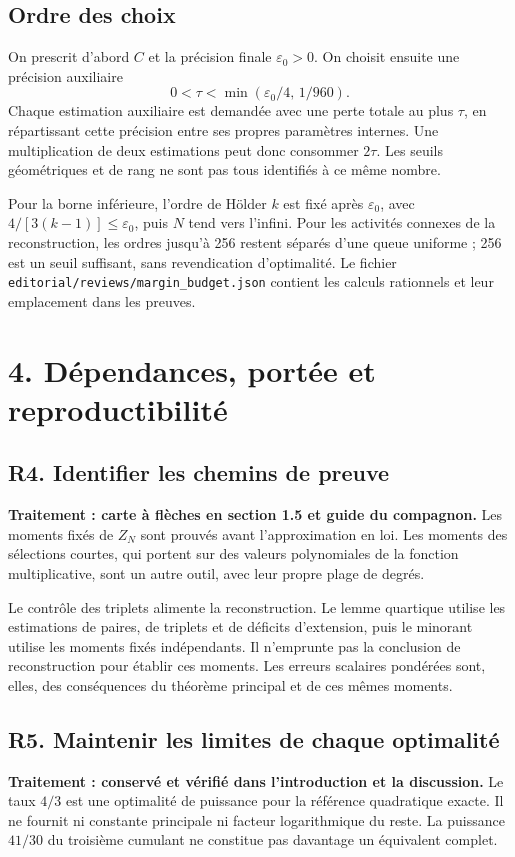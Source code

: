 \documentclass[11pt,a4paper]{article}
\newcommand{\eps}{\varepsilon}
\begin{document}
\subsection*{Ordre des choix}
On prescrit d'abord \(C\) et la précision finale \(\eps_0>0\).
On choisit ensuite une précision auxiliaire
\[
 0<\tau<\min(\eps_0/4,\,1/960).
\]
Chaque estimation auxiliaire est demandée avec une perte totale au
plus \(\tau\), en répartissant cette précision entre ses propres
paramètres internes. Une multiplication de deux estimations peut
donc consommer \(2\tau\). Les seuils géométriques et de rang ne sont
pas tous identifiés à ce même nombre.

Pour la borne inférieure, l'ordre de Hölder \(k\) est fixé après
\(\eps_0\), avec \(4/[3(k-1)]\le\eps_0\), puis \(N\) tend vers
l'infini. Pour les activités connexes de la reconstruction, les ordres
jusqu'à 256 restent séparés d'une queue uniforme ; 256 est un seuil
suffisant, sans revendication d'optimalité.
Le fichier \texttt{editorial/reviews/margin\_budget.json} contient
les calculs rationnels et leur emplacement dans les preuves.

\clearpage
\section*{4. Dépendances, portée et reproductibilité}

\subsection*{R4. Identifier les chemins de preuve}
\textbf{Traitement : carte à flèches en section 1.5 et guide du compagnon.}
Les moments fixés de \(Z_N\) sont prouvés avant l'approximation en loi.
Les moments des sélections courtes, qui portent sur des valeurs
polynomiales de la fonction multiplicative, sont un autre outil,
avec leur propre plage de degrés.

Le contrôle des triplets alimente la reconstruction. Le lemme quartique
utilise les estimations de paires, de triplets et de déficits d'extension,
puis le minorant utilise les moments fixés indépendants. Il n'emprunte
pas la conclusion de reconstruction pour établir ces moments.
Les erreurs scalaires pondérées sont, elles, des conséquences du
théorème principal et de ces mêmes moments.

\subsection*{R5. Maintenir les limites de chaque optimalité}
\textbf{Traitement : conservé et vérifié dans l'introduction et la discussion.}
Le taux \(4/3\) est une optimalité de puissance pour la référence
quadratique exacte. Il ne fournit ni constante principale ni facteur
logarithmique du reste. La puissance \(41/30\) du troisième cumulant
ne constitue pas davantage un équivalent complet.
\end{document}
